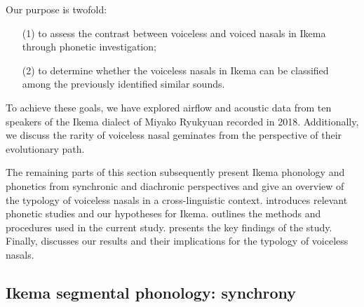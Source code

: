 \documentclass[output=paper]{langscibook}
\begin{document}
Our purpose is twofold: 

\begin{itemize}
  \item[(1)]  to assess the contrast between voiceless and voiced nasals in Ikema through phonetic investigation;
  \item[(2)]   to determine whether the voiceless nasals in Ikema can be classified among the previously identified similar sounds.
\end{itemize}

To achieve these goals, we have explored airflow and acoustic data from ten speakers of the Ikema dialect of Miyako Ryukyuan recorded in 2018. Additionally, we discuss the rarity of voiceless nasal geminates from the perspective of their evolutionary path.

\largerpage
The remaining parts of this section subsequently present Ikema phonology and phonetics from synchronic and diachronic perspectives and give an overview of the typology of voiceless nasals in a cross-linguistic context.  introduces relevant phonetic studies and our hypotheses for Ikema.  outlines the methods and procedures used in the current study.  presents the key findings of the study. Finally,  discusses our results and their implications for the typology of voiceless nasals.

\subsection{Ikema segmental phonology: synchrony}
\label{sec:shinohara:1.2}
\largerpage
\end{document}
